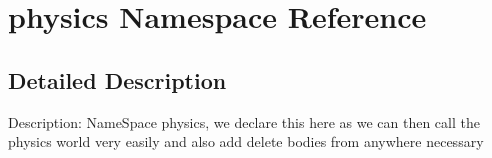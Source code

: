 \hypertarget{namespacephysics}{}\section{physics Namespace Reference}
\label{namespacephysics}


\subsection{Detailed Description}
Description\+: Name\+Space physics, we declare this here as we can then call the physics world very easily and also add delete bodies from anywhere necessary 